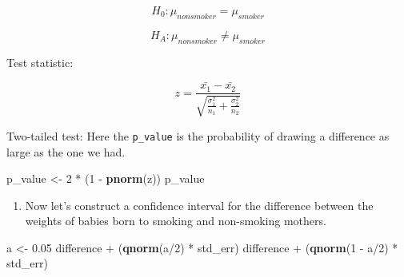 \documentclass[]{book}
\newenvironment{Shaded}{\begin{snugshade}}{\end{snugshade}}
\newcommand{\KeywordTok}[1]{\textcolor[rgb]{0.13,0.29,0.53}{\textbf{{#1}}}}
\newcommand{\DecValTok}[1]{\textcolor[rgb]{0.00,0.00,0.81}{{#1}}}
\newcommand{\FloatTok}[1]{\textcolor[rgb]{0.00,0.00,0.81}{{#1}}}
\newcommand{\StringTok}[1]{\textcolor[rgb]{0.31,0.60,0.02}{{#1}}}
\newcommand{\NormalTok}[1]{{#1}}
\providecommand{\tightlist}{%
  \setlength{\itemsep}{0pt}\setlength{\parskip}{0pt}}
\theoremstyle{definition}
\theoremstyle{definition}
\theoremstyle{remark}
\begin{document}
\[H_0: \mu_{nonsmoker} = \mu_{smoker}  \]

\[H_A: \mu_{nonsmoker} \neq \mu_{smoker} \]

Test statistic:

\[ z = \frac{\bar{x_1} - \bar{x_2}}{\sqrt{\frac{\sigma_1^2}{n_1} + \frac{\sigma_2^2}{n_2}}}  \]

\begin{Shaded}
\end{Shaded}

Two-tailed test: Here the \texttt{p\_value} is the probability of
drawing a difference as large as the one we had.

\begin{Shaded}
\begin{Highlighting}[]
\NormalTok{p_value <-}\StringTok{ }\DecValTok{2} \NormalTok{*}\StringTok{ }\NormalTok{(}\DecValTok{1} \NormalTok{-}\StringTok{ }\KeywordTok{pnorm}\NormalTok{(z))}
\NormalTok{p_value}
\end{Highlighting}
\end{Shaded}

\begin{enumerate}
\def\labelenumi{\arabic{enumi}.}
\setcounter{enumi}{4}
\tightlist
\item
  Now let's construct a confidence interval for the difference between
  the weights of babies born to smoking and non-smoking mothers.
\end{enumerate}

\begin{Shaded}
\begin{Highlighting}[]
\NormalTok{a <-}\StringTok{ }\FloatTok{0.05}
\NormalTok{difference +}\StringTok{ }\NormalTok{(}\KeywordTok{qnorm}\NormalTok{(a/}\DecValTok{2}\NormalTok{) *}\StringTok{ }\NormalTok{std_err)}
\NormalTok{difference +}\StringTok{ }\NormalTok{(}\KeywordTok{qnorm}\NormalTok{(}\DecValTok{1} \NormalTok{-}\StringTok{ }\NormalTok{a/}\DecValTok{2}\NormalTok{) *}\StringTok{ }\NormalTok{std_err)}
\end{Highlighting}
\end{Shaded}
\end{document}
